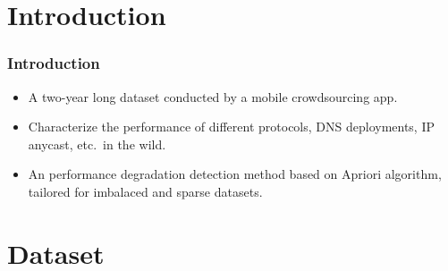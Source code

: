 \section{Introduction}

\begin{frame}
    \frametitle{Introduction}

    \begin{itemize}
        \item A two-year long dataset conducted by a mobile crowdsourcing app.

        \item Characterize the performance of different protocols, DNS deployments, IP anycast, etc.\ in the wild.

        \item An performance degradation detection method based on Apriori algorithm, tailored for imbalaced and sparse datasets.
    \end{itemize}

\end{frame}

\section{Dataset}

